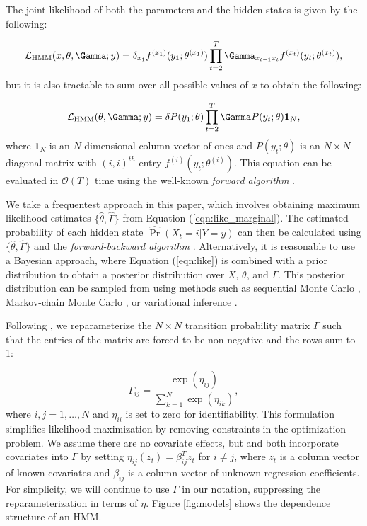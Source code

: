 The joint likelihood of both the parameters and the hidden states is given by the following:

\begin{equation}
    \calL_{\text{HMM}}(x,\theta,\Gamma;y) = \delta_{x_1} f^{(x_1)}(y_1; \theta^{(x_1)}) \prod_{t=2}^T \Gamma_{x_{t-1} x_t} f^{(x_t)}(y_t; \theta^{(x_t)}),
    \label{eqn:like}
\end{equation}
%
but it is also tractable to sum over all possible values of $x$ to obtain the following:

\begin{equation}
    \calL_{\text{HMM}}(\theta,\Gamma;y) = \delta P(y_1;\theta) \prod_{t=2}^T \Gamma P(y_t;\theta) \mathbf{1}_N,
    \label{eqn:like_marginal}
\end{equation}
%
where $\mathbf{1}_N$ is an $N$-dimensional column vector of ones and $P(y_t;\theta)$ is an $N \times N$ diagonal matrix with $(i,i)^{th}$ entry $f^{(i)}(y_t; \theta^{(i)})$. This equation can be evaluated in $\mathcal{O}(T)$ time using the well-known \textit{forward algorithm} \citep{Zucchini:2016}.

We take a frequentest approach in this paper, which involves obtaining maximum likelihood estimates $\{\hat \theta, \hat \Gamma\}$ from Equation (\ref{eqn:like_marginal}). The estimated probability of each hidden state $\hat{\Pr}(X_t = i|Y = y)$ can then be calculated using $\{\hat \theta, \hat \Gamma\}$ and the \textit{forward-backward algorithm} \citep{Zucchini:2016}. Alternatively, it is reasonable to use a Bayesian approach, where Equation (\ref{eqn:like}) is combined with a prior distribution to obtain a posterior distribution over $X$, $\theta$, and $\Gamma$. This posterior distribution can be sampled from using methods such as sequential Monte Carlo \citep{Douc:2011b}, Markov-chain Monte Carlo \citep{Scott:2002}, or variational inference \citep{Foti:2014}.
%

Following \citet{Barajas:2017}, we reparameterize the $N \times N$ transition probability matrix $\Gamma$ such that the entries of the matrix are forced to be non-negative and the rows sum to 1:

\[
\Gamma_{ij} = \frac{\exp(\eta_{ij})}{\sum_{k=1}^N \exp(\eta_{ik})}, 
\]
%
where $i,j = 1,\ldots,N$ and $\eta_{ii}$ is set to zero for identifiability. This formulation simplifies likelihood maximization by removing constraints in the optimization problem. We assume there are no covariate effects, but \cite{DeSouza:2017} and \citet{Adam:2019} both incorporate covariates into $\Gamma$ by setting $\eta_{ij}(z_t) = \beta_{ij}^T z_t$ for $i \neq j$, where $z_t$ is a column vector of known covariates and $\beta_{ij}$ is a column vector of unknown regression coefficients. For simplicity, we will continue to use $\Gamma$ in our notation, suppressing the reparameterization in terms of $\eta$. Figure \ref{fig:models} shows the dependence structure of an HMM.

